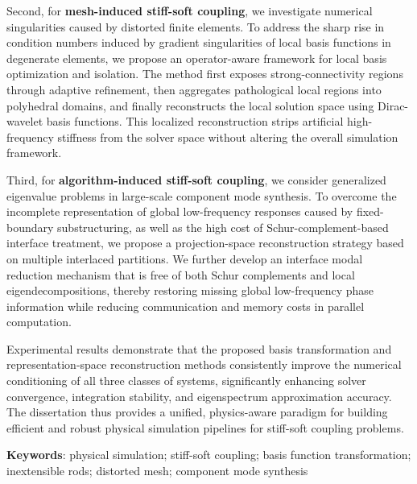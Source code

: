 Second, for \textbf{mesh-induced stiff-soft coupling}, we investigate numerical singularities caused by distorted finite elements. To address the sharp rise in condition numbers induced by gradient singularities of local basis functions in degenerate elements, we propose an operator-aware framework for local basis optimization and isolation. The method first exposes strong-connectivity regions through adaptive refinement, then aggregates pathological local regions into polyhedral domains, and finally reconstructs the local solution space using Dirac-wavelet basis functions. This localized reconstruction strips artificial high-frequency stiffness from the solver space without altering the overall simulation framework.

Third, for \textbf{algorithm-induced stiff-soft coupling}, we consider generalized eigenvalue problems in large-scale component mode synthesis. To overcome the incomplete representation of global low-frequency responses caused by fixed-boundary substructuring, as well as the high cost of Schur-complement-based interface treatment, we propose a projection-space reconstruction strategy based on multiple interlaced partitions. We further develop an interface modal reduction mechanism that is free of both Schur complements and local eigendecompositions, thereby restoring missing global low-frequency phase information while reducing communication and memory costs in parallel computation.

Experimental results demonstrate that the proposed basis transformation and representation-space reconstruction methods consistently improve the numerical conditioning of all three classes of systems, significantly enhancing solver convergence, integration stability, and eigenspectrum approximation accuracy. The dissertation thus provides a unified, physics-aware paradigm for building efficient and robust physical simulation pipelines for stiff-soft coupling problems.

\bigskip
\noindent \textbf{Keywords}: physical simulation; stiff-soft coupling; basis function transformation; inextensible rods; distorted mesh; component mode synthesis
